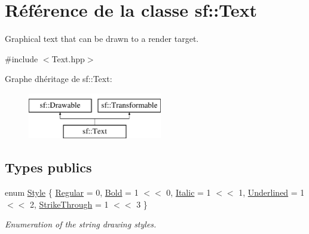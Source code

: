 \hypertarget{classsf_1_1Text}{}\section{Référence de la classe sf\+:\+:Text}
\label{classsf_1_1Text}


Graphical text that can be drawn to a render target.  




{\ttfamily \#include $<$Text.\+hpp$>$}

Graphe d\textquotesingle{}héritage de sf\+:\+:Text\+:\begin{figure}[H]
\begin{center}
\leavevmode
\includegraphics[height=2.000000cm]{classsf_1_1Text}
\end{center}
\end{figure}
\subsection*{Types publics}
\begin{DoxyCompactItemize}
\item 
enum \hyperlink{classsf_1_1Text_aa8add4aef484c6e6b20faff07452bd82}{Style} \{ \newline
\hyperlink{classsf_1_1Text_aa8add4aef484c6e6b20faff07452bd82a2af9ae5e1cda126570f744448e0caa32}{Regular} = 0, 
\hyperlink{classsf_1_1Text_aa8add4aef484c6e6b20faff07452bd82af1b47f98fb1e10509ba930a596987171}{Bold} = 1 $<$$<$ 0, 
\hyperlink{classsf_1_1Text_aa8add4aef484c6e6b20faff07452bd82aee249eb803848723c542c2062ebe69d8}{Italic} = 1 $<$$<$ 1, 
\hyperlink{classsf_1_1Text_aa8add4aef484c6e6b20faff07452bd82a664bd143f92b6e8c709d7f788e8b20df}{Underlined} = 1 $<$$<$ 2, 
\newline
\hyperlink{classsf_1_1Text_aa8add4aef484c6e6b20faff07452bd82a9ed1f5bb154c21269e1190c5aa97d479}{Strike\+Through} = 1 $<$$<$ 3
 \}\begin{DoxyCompactList}\small\item\em Enumeration of the string drawing styles. \end{DoxyCompactList}
\end{DoxyCompactItemize}
